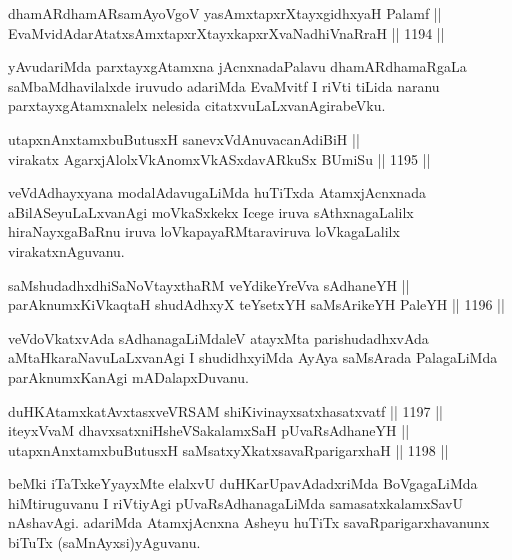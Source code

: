 
\begin{shl}
dhamARdhamARsamAyoVgoV yasAmxtapxrXtayxgidhxyaH Palamf ||  \\
EvaMvidAdarAtatxsAmxtapxrXtayxkapxrXvaNadhiVnaRraH \hfill || 1194 ||  
\end{shl}

\begin{artha}
yAvudariMda parxtayxgAtamxna jAcnxnadaPalavu dhamARdhamaRgaLa saMbaMdhavilalxde iruvudo adariMda EvaMvitf I riVti tiLida naranu parxtayxgAtamxnalelx nelesida citatxvuLaLxvanAgirabeVku.
\end{artha}

\begin{shl}
utapxnAnxtamxbuButusxH sanevxVdAnuvacanAdiBiH || \\
virakatx AgarxjAlolxVkAnomxVkASxdavARkuSx BUmiSu \hfill || 1195 || 
\end{shl}

\begin{artha}
veVdAdhayxyana modalAdavugaLiMda huTiTxda AtamxjAcnxnada aBilASeyuLaLxvanAgi moVkaSxkekx Icege iruva sAthxnagaLalilx hiraNayxgaBaRnu iruva loVkapayaRMtaraviruva loVkagaLalilx virakatxnAguvanu.
\end{artha}


\begin{shl}
saMshudadhxdhiSaNoV\s tayxthaRM veYdikeYreVva sAdhaneYH || \\
parAknumxKiVkaqtaH shudAdhxyX teYsetxYH saMsArikeYH PaleYH \hfill || 1196 ||  
\end{shl}

\begin{artha}
veVdoVkatxvAda sAdhanagaLiMdaleV atayxMta parishudadhxvAda aMtaHkaraNavuLaLxvanAgi I shudidhxyiMda AyAya saMsArada PalagaLiMda parAknumxKanAgi mADalapxDuvanu.
\end{artha}


\begin{shl}
duHKAtamxkatAvxtasxveVRSAM shiKivinayxsatxhasatxvatf \hfill || 1197 ||  \\
iteyxVvaM dhavxsatxniHsheVSakalamxSaH pUvaRsAdhaneYH || \\
utapxnAnxtamxbuButusxH saMsatxyXkatxsavaRparigarxhaH \hfill || 1198 ||  
\end{shl}

\begin{artha}
beMki iTaTxkeYyayxMte elalxvU duHKarUpavAdadxriMda BoVgagaLiMda hiMtiruguvanu I riVtiyAgi pUvaRsAdhanagaLiMda samasatxkalamxSavU nAshavAgi. adariMda AtamxjAcnxna Asheyu huTiTx savaRparigarxhavanunx biTuTx (saMnAyxsi)yAguvanu.
\end{artha}

